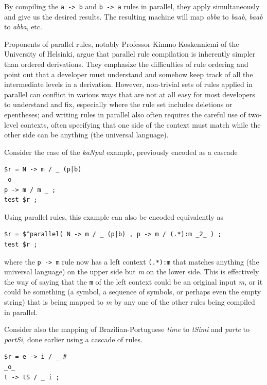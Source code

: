 \noindent
By compiling the \texttt{a -> b} and \texttt{b -> a} rules in parallel, they apply simultaneously and give us the desired
results.
The resulting machine will map \emph{abba} to \emph{baab}, \emph{baab} to \emph{abba},
etc. 


Proponents of parallel rules, notably Professor Kimmo Koskenniemi of the University of
Helsinki, argue that parallel rule compilation is inherently simpler than ordered
derivations.  They emphasize the difficulties of rule ordering and point out that a
developer must understand and somehow keep track of all the intermediate levels in a
derivation.  However, non-trivial sets of rules applied in parallel can conflict in
various ways that are not at all easy for most developers to understand and fix,
especially where the rule set includes deletions or epentheses; and writing rules in parallel
also often requires the careful use of two-level contexts, often specifying that one side
of the context must match while the other side can be anything (the universal language).

Consider the case of the \emph{kaNpat} example, previously encoded as a cascade 

\begin{Verbatim}
$r = N -> m / _ (p|b)
_o_
p -> m / m _ ;
test $r ;
\end{Verbatim}

\noindent
Using parallel rules, this example can also be encoded equivalently as

\begin{Verbatim}
$r = $^parallel( N -> m / _ (p|b) , p -> m / (.*):m _2_ ) ;
test $r ;
\end{Verbatim}

\noindent
where the \texttt{p -> m} rule now has a left context \texttt{(.*):m} that matches
anything (the universal language) on the upper side but \emph{m} on the lower
side.  This is effectively the way of saying that the \texttt{m} of the left context could
be an original input \emph{m}, or it could be something (a symbol, a sequence of symbols,
or perhaps even the empty string) that is being mapped to \emph{m} by
any one of the other rules
being compiled in parallel.  

Consider also the mapping of Brazilian-Portuguese \emph{time} to \emph{tSimi} and \emph{parte} to \emph{partSi}, done earlier using a cascade of rules.  


\begin{Verbatim}
$r = e -> i / _ #
_o_
t -> tS / _ i ;
\end{Verbatim}


